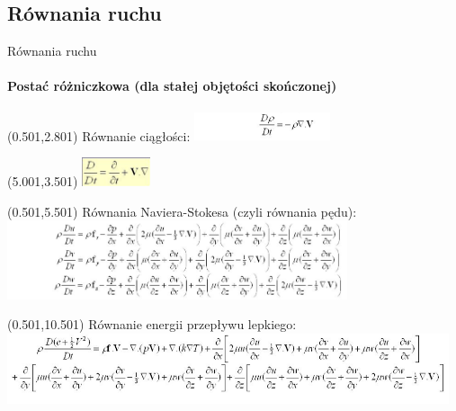 \documentclass[aspectratio=169]{beamer}
\begin{document}
\subsection{Równania ruchu}
\begin{frame}{Równania ruchu}
\framesubtitle{Postać różniczkowa (dla stałej objętości skończonej)}
\begin{textblock}{4}(0.501,2.801)
Równanie ciągłości:
\includegraphics[width=4cm]{imgs/ciaglosc.png}
\end{textblock}
\begin{textblock}{4}(5.001,3.501)
\includegraphics[width=2cm]{imgs/ciaglosc2.png}
\end{textblock}
\begin{textblock}{10}(0.501,5.501)
Równania Naviera-Stokesa (czyli równania pędu):
\includegraphics[width=10cm]{imgs/NS.png}
\end{textblock}
\begin{textblock}{13}(0.501,10.501)
Równanie energii przepływu lepkiego:
\includegraphics[width=13cm]{imgs/energia.png}
\end{textblock}
\end{frame}
\end{document}
